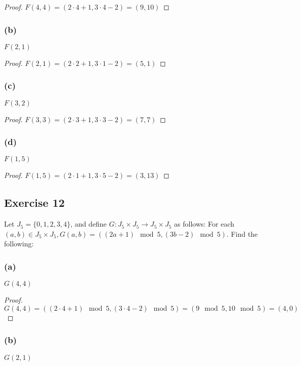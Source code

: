 \documentclass[14pt]{extarticle}
\begin{document}
\begin{proof}
    \(F(4, 4) = (2 \cdot 4 + 1, 3 \cdot 4 - 2) = (9, 10)\)
\end{proof}

\subsubsection{(b)}
$F(2,1)$

\begin{proof}
    \(F(2, 1) = (2 \cdot 2 + 1, 3 \cdot 1 - 2) = (5, 1)\)
\end{proof}

\subsubsection{(c)}
$F(3,2)$

\begin{proof}
    \(F(3, 3) = (2 \cdot 3 + 1, 3 \cdot 3 - 2) = (7, 7)\)
\end{proof}

\subsubsection{(d)}
$F(1,5)$

\begin{proof}
    \(F(1, 5) = (2 \cdot 1 + 1, 3 \cdot 5 - 2) = (3, 13)\)
\end{proof}

\subsection{Exercise 12}
Let \(J_5 = \{0, 1, 2, 3, 4\}\), and define \(G: J_5 \times J_5 \to J_5 \times J_5\) as follows: For each \((a,b) \in
J_5 \times J_5, G(a,b) = ((2a+1) \mod 5, (3b-2) \mod 5)\). Find the following:

\subsubsection{(a)}
$G(4,4)$

\begin{proof}
    \(G(4, 4) = ((2 \cdot 4 + 1) \mod 5, (3 \cdot 4 - 2) \mod 5) = (9 \mod 5, 10 \mod 5) = (4, 0)\)
\end{proof}

\subsubsection{(b)}
$G(2,1)$
\end{document}
